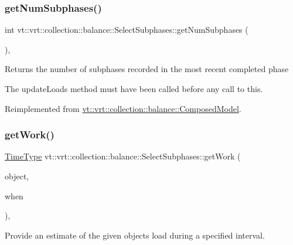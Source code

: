 \subsubsection{\texorpdfstring{get\+Num\+Subphases()}{getNumSubphases()}}
{\footnotesize\ttfamily int vt\+::vrt\+::collection\+::balance\+::\+Select\+Subphases\+::get\+Num\+Subphases (\begin{DoxyParamCaption}{ }\end{DoxyParamCaption})\hspace{0.3cm}{\ttfamily [override]}, {\ttfamily [virtual]}}

Returns the number of subphases recorded in the most recent completed phase

The {\ttfamily update\+Loads} method must have been called before any call to this. 

Reimplemented from \hyperlink{classvt_1_1vrt_1_1collection_1_1balance_1_1_composed_model_af3ea09828c281d9c278198a19fe4e533}{vt\+::vrt\+::collection\+::balance\+::\+Composed\+Model}.

\mbox{\label{classvt_1_1vrt_1_1collection_1_1balance_1_1_select_subphases_a77cf76f7699c9480483cb4104bf58965}} 
\subsubsection{\texorpdfstring{get\+Work()}{getWork()}}
{\footnotesize\ttfamily \hyperlink{namespacevt_a876a9d0cd5a952859c72de8a46881442}{Time\+Type} vt\+::vrt\+::collection\+::balance\+::\+Select\+Subphases\+::get\+Work (\begin{DoxyParamCaption}\item[{\hyperlink{structvt_1_1vrt_1_1collection_1_1balance_1_1_element_i_d_struct}{Element\+I\+D\+Struct}}]{object,  }\item[{\hyperlink{structvt_1_1vrt_1_1collection_1_1balance_1_1_phase_offset}{Phase\+Offset}}]{when }\end{DoxyParamCaption})\hspace{0.3cm}{\ttfamily [override]}, {\ttfamily [virtual]}}



Provide an estimate of the given object\textquotesingle{}s load during a specified interval. 


